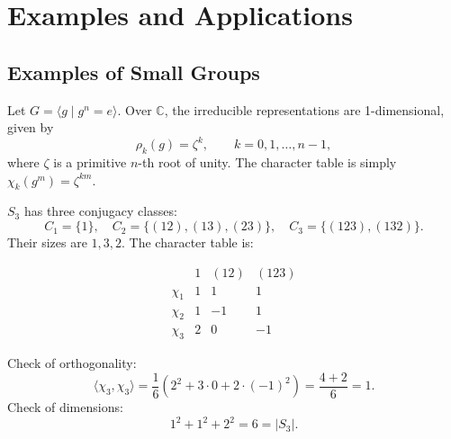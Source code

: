 
\chapter{Examples and Applications}

\section{Examples of Small Groups}
\begin{exmp}
Let \(G = \langle g \mid g^n = e \rangle\). Over \(\mathbb{C}\), the irreducible representations are 1-dimensional, given by
\[
\rho_k(g) = \zeta^k, \qquad k = 0,1,\dots,n-1,
\]
where \(\zeta\) is a primitive \(n\)-th root of unity. The character table is simply \(\chi_k(g^m) = \zeta^{km}\).
\end{exmp}

\begin{exmp}
\(S_3\) has three conjugacy classes:
\[
C_1 = \{1\}, \quad C_2 = \{(12), (13), (23)\}, \quad C_3 = \{(123), (132)\}.
\]
Their sizes are \(1, 3, 2\). The character table is:

\[
\begin{array}{c|ccc}
 & 1 & (12) & (123) \\
\hline
\chi_1 & 1 & 1 & 1 \\
\chi_2 & 1 & -1 & 1 \\
\chi_3 & 2 & 0 & -1
\end{array}
\]

Check of orthogonality:
\[
\langle \chi_3, \chi_3 \rangle = \frac{1}{6}(2^2 + 3 \cdot 0 + 2 \cdot (-1)^2) = \frac{4 + 2}{6} = 1.
\]
Check of dimensions:
\[
1^2 + 1^2 + 2^2 = 6 = |S_3|.
\]
\end{exmp}

